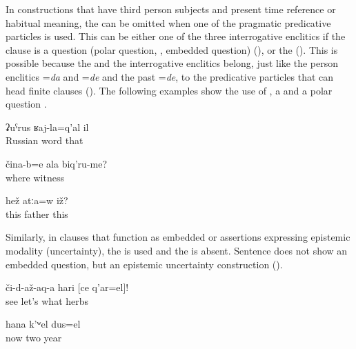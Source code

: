 In  constructions that have third person subjects and present time reference or habitual meaning, the  can be omitted when one of the pragmatic predicative particles is used. This can be either one of the three interrogative enclitics if the  clause is a question (polar question, , embedded question) (), or the   (). This is possible because the  and the interrogative enclitics belong, just like the person enclitics =\textit{da} and =\textit{de} and the past  =\textit{de}, to the predicative particles that can head finite clauses (). The following examples show the use of  , a   and a polar question .
%
\begin{exe}
	\ex	\label{ex:‎That is a Russian word}
	\gll	ʡuˁrus	ʁaj-la=q'al	il\\
		Russian	word	that	\\
	\glt	{}

	\ex	\label{ex:Where are your witnesses}
	\gll	čina-b=e	ala	biq'ru-me?\\
		where		witness\\
	\glt	{}

	\ex	\label{ex:Is this the father}
	\gll	hež	atːa=w	iž?\\
		this	father	this\\
	\glt	{}
\end{exe}

Similarly, in  clauses that function as embedded  or assertions expressing epistemic modality (uncertainty), the  is used  and the  is absent. Sentence  does not show an embedded question, but an epistemic uncertainty construction ().
%
\begin{exe}
	\ex	\label{ex:‎Show what herbs these are}
	\gll	či-d-až-aq-a	hari	[ce	q'ar=el]!\\
		see	let's	what	herbs\\
	\glt	{}

	\ex	\label{ex:Now it is probably two years (that have passed by)}
	\gll	hana	k'ʷel	dus=el\\
		now	two	year\\
	\glt	{}
\end{exe}

